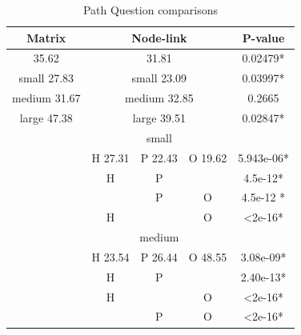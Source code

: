 \documentclass{l4proj}
\begin{document}
\begin{table}[H]
\centering
\caption{Path Question comparisons}
\label{pathResults}
\begin{tabular}{|c|c|c|c|c|c|c|}
\hline
\multicolumn{3}{|c|}{\textbf{Matrix}}     & \multicolumn{3}{c|}{\textbf{Node-link}} & \textbf{P-value} \\ \hline
\multicolumn{3}{|c|}{35.62}               & \multicolumn{3}{c|}{31.81}              & 0.02479*         \\ \hline
\multicolumn{3}{|c|}{small 27.83}         & \multicolumn{3}{c|}{small 23.09}        & 0.03997*         \\ \hline
\multicolumn{3}{|c|}{medium 31.67}        & \multicolumn{3}{c|}{medium 32.85}       & 0.2665           \\ \hline
\multicolumn{3}{|c|}{large 47.38}         & \multicolumn{3}{c|}{large 39.51}        & 0.02847*         \\ \hline
\multicolumn{3}{|c|}{\multirow{15}{*}{\cellcolor{gray}}}  & \multicolumn{3}{c|}{small} & \cellcolor{gray}                                 \\ \cline{4-7} 
\multicolumn{3}{|c|}{\cellcolor{gray}}                    & H 27.31      & P 22.43     & O 19.62    & 5.943e-06*       \\ \cline{4-7} 
\multicolumn{3}{|c|}{\cellcolor{gray}}                    & H            & P &\cellcolor{gray}  & 4.5e-12*         \\ \cline{4-7} 
\multicolumn{3}{|c|}{\cellcolor{gray}}                    &\cellcolor{gray} & P     & O          & 4.5e-12 *        \\ \cline{4-7} 
\multicolumn{3}{|c|}{\cellcolor{gray}}                    & H            & \cellcolor{gray} & O   & \textless 2e-16* \\ \cline{4-7} 
\multicolumn{3}{|c|}{\cellcolor{gray}}                    & \multicolumn{3}{c|}{medium}  &\cellcolor{gray}                              \\ \cline{4-7} 
\multicolumn{3}{|c|}{\cellcolor{gray}}                    & H 23.54      & P 26.44     & O 48.55    & 3.08e-09*        \\ \cline{4-7} 
\multicolumn{3}{|c|}{\cellcolor{gray}}                    & H            & P &\cellcolor{gray}   & 2.40e-13*        \\ \cline{4-7} 
\multicolumn{3}{|c|}{\cellcolor{gray}}                    & H & \cellcolor{gray}     & O          & \textless 2e-16* \\ \cline{4-7} 
\multicolumn{3}{|c|}{\cellcolor{gray}}                    & \cellcolor{gray} & P     & O          & \textless 2e-16* \\ \cline{4-7} 

\end{tabular}
\end{table}
\end{document}
